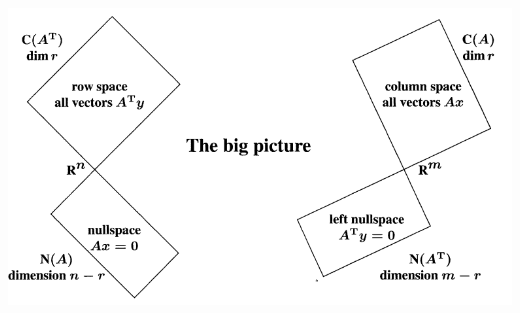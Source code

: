 \begin{center}
    \includegraphics[scale = 0.4]{../images/SpacesDimensions.png}
\end{center}


\\



